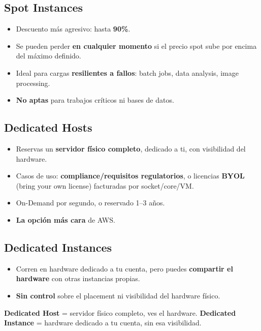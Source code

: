 \documentclass[11pt,a4paper]{article}
\let\oldsubsection\subsection
\renewcommand{\subsection}{\Needspace{6\baselineskip}\oldsubsection}
\begin{document}
\subsection{Spot Instances}
\begin{itemize}
  \item Descuento más agresivo: hasta \textbf{90\%}.
  \item Se pueden perder \textbf{en cualquier momento} si el precio spot sube por encima del máximo definido.
  \item Ideal para cargas \textbf{resilientes a fallos}: batch jobs, data analysis, image processing.
  \item \textbf{No aptas} para trabajos críticos ni bases de datos.
\end{itemize}

\subsection{Dedicated Hosts}
\begin{itemize}
  \item Reservas un \textbf{servidor físico completo}, dedicado a ti, con visibilidad del hardware.
  \item Casos de uso: \textbf{compliance/requisitos regulatorios}, o licencias \textbf{BYOL} (bring your own license) facturadas por socket/core/VM.
  \item On-Demand por segundo, o reservado 1--3 años.
  \item \textbf{La opción más cara} de AWS.
\end{itemize}

\subsection{Dedicated Instances}
\begin{itemize}
  \item Corren en hardware dedicado a tu cuenta, pero puedes \textbf{compartir el hardware} con otras instancias propias.
  \item \textbf{Sin control} sobre el placement ni visibilidad del hardware físico.
\end{itemize}

\begin{truco}[title=Host vs. Instance]
\textbf{Dedicated Host} = servidor físico completo, ves el hardware. \textbf{Dedicated Instance} = hardware dedicado a tu cuenta, sin esa visibilidad.
\end{truco}
\end{document}

